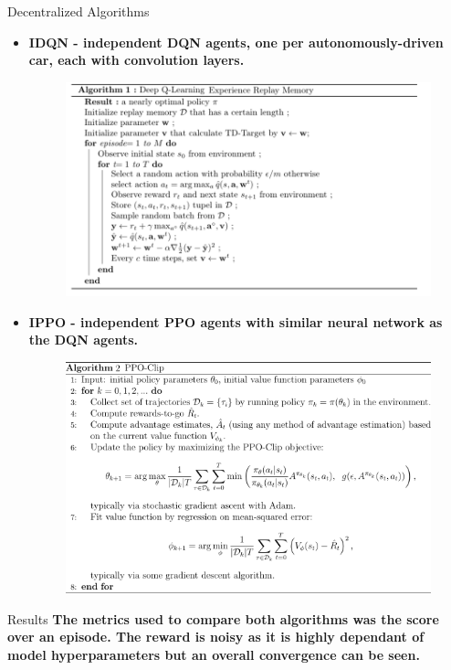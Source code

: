 \documentclass[final]{beamer}
\newlength{\onecolwid}
\begin{document}
\begin{frame}[t]
\begin{columns}[t]
\begin{column}{\onecolwid}
\begin{block}{Decentralized Algorithms}
    \begin{itemize}
        \item \textbf{IDQN - independent DQN agents, one per autonomously-driven car, each with convolution layers.}
        \begin{figure}[!ht]
            \vspace*{0.1cm}
            \includegraphics[width=0.7\linewidth, height=0.37\linewidth]{images/DQN-Algorithm.png}
        \end{figure}
        \item \textbf{IPPO - independent PPO agents with similar neural network as the DQN agents.}
        \begin{figure}[!ht]
            \vspace*{0.1cm}
            \includegraphics[width=0.7\linewidth, height=0.37\linewidth]{images/ppo_algorithm.png}
        \end{figure}
    \end{itemize}
 \end{block} 
 
\begin{block}{Results}
    \textbf{The metrics used to compare both algorithms was the score over an episode. The reward is noisy as it is highly dependant of model
    hyperparameters but an overall convergence can be seen.}


\end{block}
\end{column}
\end{columns}
\end{frame}
\end{document}

